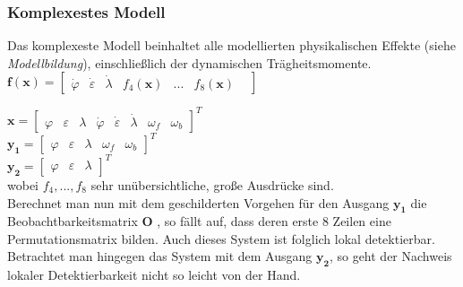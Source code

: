 \documentclass[times, 9pt,twocolumn]{article}
\begin{document}
	\subsubsection{Komplexestes Modell}
	Das komplexeste Modell beinhaltet alle modellierten physikalischen Effekte (siehe \textit{Modellbildung}), einschließlich der dynamischen Trägheitsmomente. \\
	$\bm f(\bm x) = \begin{bmatrix}
	\dot \varphi &
	\dot \varepsilon &
	\dot \lambda  &
	f_4(\bm x) &
	... &
	f_8(\bm x) &
	\end{bmatrix} $ \\ 

	$\bm x = \begin{bmatrix}
	\varphi & \varepsilon & \lambda & \dot \varphi & \dot \varepsilon & \dot \lambda & \omega_f & \omega_b
	\end{bmatrix}^T $ \\ 
	$\bm {y_1} = \begin{bmatrix}
	\varphi & \varepsilon & \lambda & \omega_f & \omega_b
	\end{bmatrix}^T $ \\
	$\bm {y_2} = \begin{bmatrix}
	\varphi & \varepsilon & \lambda 
	\end{bmatrix}^T $ \\ wobei $f_4, ..., f_8$ sehr unübersichtliche, große Ausdrücke sind. \\
	Berechnet man nun mit dem geschilderten Vorgehen für den Ausgang $\bm{y_1}$
	die Beobachtbarkeitsmatrix $\bm O$ , so fällt auf, dass deren erste 8 Zeilen eine Permutationsmatrix bilden. Auch dieses System ist folglich lokal detektierbar. \\
	Betrachtet man hingegen das System mit dem Ausgang $\bm{y_2}$, so geht der Nachweis lokaler Detektierbarkeit nicht so leicht von der Hand. 
\end{document}
